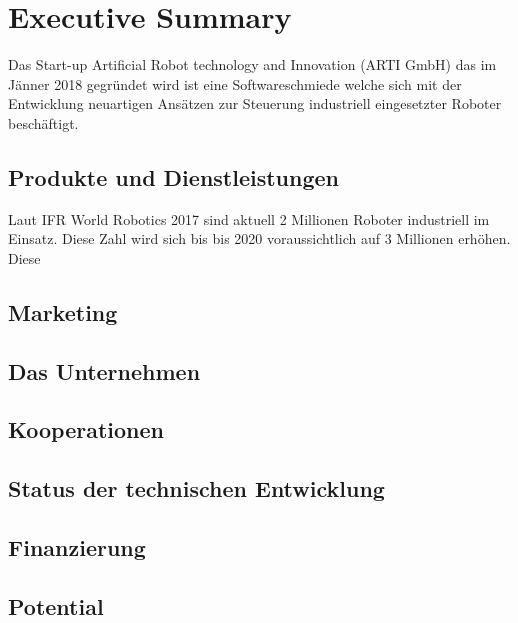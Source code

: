 \chapter{Executive Summary}

Das Start-up Artificial Robot technology and Innovation (ARTI GmbH) das im Jänner 2018 gegründet wird ist eine Softwareschmiede welche sich mit der Entwicklung neuartigen Ansätzen zur Steuerung industriell eingesetzter Roboter beschäftigt.

\section{Produkte und Dienstleistungen}

Laut IFR World Robotics 2017 sind aktuell 2 Millionen Roboter industriell im Einsatz. Diese Zahl wird sich bis bis 2020 voraussichtlich auf 3 Millionen erhöhen. Diese 

\section{Marketing}

\section{Das Unternehmen}

\section{Kooperationen}

\section{Status der technischen Entwicklung}

\section{Finanzierung}

\section{Potential}

\blindtext
\newpage
\blindtextkl